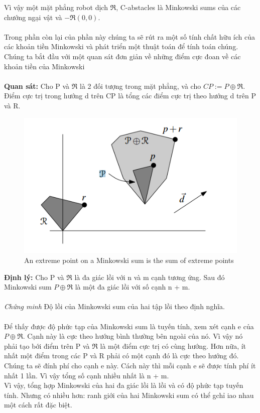 \documentclass[a4paper,12pt]{report}
\begin{document}
Vì vậy một mặt phẳng robot dịch $\Re$, C-abstacles là Minkowski sums của các chướng ngại vật và $-\Re(0,0)$. \\ \\
Trong phần còn lại của phần này chúng ta sẽ rút ra một số tính chất hữu ích của các khoản tiền Minkowski và phát triển một thuật toán để tính toán chúng. Chúng ta bắt đầu với một quan sát đơn giản về những điểm cực đoan về các khoản tiền của Minkowski \\ \\
\textbf{Quan sát: }Cho P và $\Re$ là 2 đối tượng trong mặt phẳng, và cho $CP := P \oplus \Re$. Điểm cực trị trong hướng d trên CP là tổng các điểm cực trị theo hướng d trên P và R.\\
\begin{figure}[h]
\begin{center}
\includegraphics[width=0.5\linewidth]{5.png}
\caption{An extreme point on a Minkowski sum is the sum of extreme points}
\end{center}
\end{figure}
\textbf{Định lý: } Cho P và $\Re$ là đa giác lồi với n và m cạnh tương ứng. Sau đó Minkowski sum $P \oplus \Re$ là một đa giác lồi với số cạnh n + m. \\ \\
\textit{Chứng minh} Độ lồi của Minkowski sum của hai tập lồi theo định nghĩa. \\ \\
Để thấy được độ phức tạp của Minkowski sum là tuyến tính, xem xét cạnh e của $P \oplus \Re$. Cạnh này là cực theo hướng bình thường bên ngoài của nó. Vì vậy nó phải tạo bới điểm trên P và $\Re$ là một điểm cực trị có cùng hướng. Hơn nữa, ít nhất một điểm trong các P và R phải có một cạnh đó là cực theo hướng đó. Chúng ta sẽ đính phí cho cạnh e này. Cách này thì mỗi cạnh e sẽ được tính phí ít nhất 1 lần. Vì vậy tổng số cạnh nhiều nhất là n + m. \\
Vì vậy, tổng hợp Minkowski của hai đa giác lồi là lồi và có độ phức tạp tuyến tính. Nhưng có nhiều hơn: ranh giới của hai Minkowski sum có thể gchỉ iao nhau một cách rất đặc biệt. \\
\end{document}
